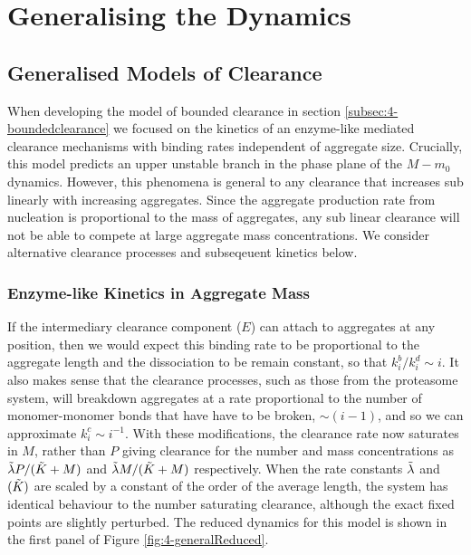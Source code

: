 \section{Generalising the Dynamics}

\subsection{Generalised Models of Clearance}

When developing the model of bounded clearance in section \ref{subsec:4-boundedclearance} we focused on the kinetics of an enzyme-like mediated clearance mechanisms with binding rates independent of aggregate size. Crucially, this model predicts an upper unstable branch in the phase plane of the $M-m_0$ dynamics. However, this phenomena is general to any clearance that increases sub linearly with increasing aggregates. Since the aggregate production rate from nucleation is proportional to the mass of aggregates, any sub linear clearance will not be able to compete at large aggregate mass concentrations. We consider alternative clearance processes and subseqeuent kinetics below.

\subsubsection{Enzyme-like Kinetics in Aggregate Mass}

If the intermediary clearance component ($E$) can attach to aggregates at any position, then we would expect this binding rate to be proportional to the aggregate length and the dissociation to be remain constant, so that ${k_i^b}/{k_i^d}\sim i$. It also makes sense that the clearance processes, such as those from the proteasome system, will breakdown aggregates at a rate proportional to the number of monomer-monomer bonds that have have to be broken, $\sim(i-1)$, and so we can approximate $k_i^{c} \sim i^{-1}$. With these modifications, the clearance rate now saturates in $M$, rather than $P$ giving clearance for the number and mass concentrations as $\Tilde{\lambda}P/(\Tilde{K}+M)$ and $\Tilde{\lambda}M/(\Tilde{K}+M)$ respectively. When the rate constants $\Tilde{\lambda}$ and $(\Tilde{K})$ are scaled by a constant of the order of the average length, the system has identical behaviour to the number saturating clearance, although the exact fixed points are slightly perturbed. The reduced dynamics for this model is shown in the first panel of Figure \ref{fig:4-generalReduced}.

